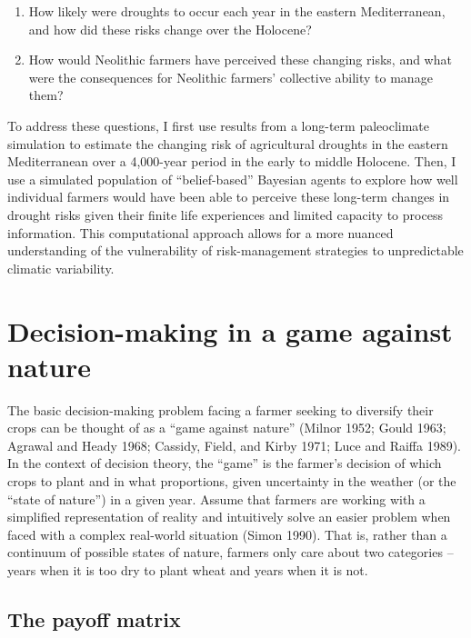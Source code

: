\documentclass[smallextended]{svjour3}       %
\begin{document}
\begin{enumerate}
\def\labelenumi{\arabic{enumi}.}
\item
  How likely were droughts to occur each year in the eastern Mediterranean, and how did these risks change over the Holocene?
\item
  How would Neolithic farmers have perceived these changing risks, and what were the consequences for Neolithic farmers' collective ability to manage them?
\end{enumerate}

To address these questions, I first use results from a long-term paleoclimate simulation to estimate the changing risk of agricultural droughts in the eastern Mediterranean over a 4,000-year period in the early to middle Holocene. Then, I use a simulated population of ``belief-based'' Bayesian agents to explore how well individual farmers would have been able to perceive these long-term changes in drought risks given their finite life experiences and limited capacity to process information. This computational approach allows for a more nuanced understanding of the vulnerability of risk-management strategies to unpredictable climatic variability.

\hypertarget{sec:1}{%
\section{Decision-making in a game against nature}\label{sec:1}}

The basic decision-making problem facing a farmer seeking to diversify their crops can be thought of as a ``game against nature'' (Milnor 1952; Gould 1963; Agrawal and Heady 1968; Cassidy, Field, and Kirby 1971; Luce and Raiffa 1989). In the context of decision theory, the ``game'' is the farmer's decision of which crops to plant and in what proportions, given uncertainty in the weather (or the ``state of nature'') in a given year. Assume that farmers are working with a simplified representation of reality and intuitively solve an easier problem when faced with a complex real-world situation (Simon 1990). That is, rather than a continuum of possible states of nature, farmers only care about two categories -- years when it is too dry to plant wheat and years when it is not.

\hypertarget{the-payoff-matrix}{%
\subsection{The payoff matrix}\label{the-payoff-matrix}}
\end{document}
